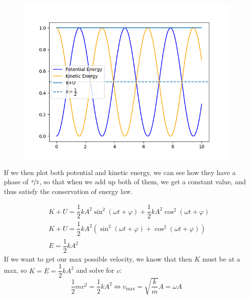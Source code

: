 \documentclass{report}
\begin{document}
        \begin{figure}
          \vspace{-1.4cm}
          \centering
          \includegraphics[width=\textwidth]{fotos/energies.png}
        \end{figure}

        \noindent If we then plot both potential and kinetic energy, we can see how they have a phase of $\nicefrac{\pi}{2}$, so that when we add up both of them, we get a constant value, and thus satisfy the conservation of energy law.
        
        \begin{equation}
          \begin{aligned}
          &K+U=\dfrac{1}{2}kA^2\sin^2(\omega t+\varphi)+\dfrac{1}{2}kA^2\cos^2(\omega t+\varphi)\\
          &K+U=\dfrac{1}{2}kA^2\left(\sin^2(\omega t+\varphi)+\cos^2(\omega t+\varphi)\right)\\
          &\boxed{E = \dfrac{1}{2}kA^2}
          \end{aligned}
        \end{equation}
        If we want to get our max possible velocity, we know that then $K$ must be at a max, so $K=E=\dfrac{1}{2}kA^2$ and solve for $v$:
        \begin{equation}
          \dfrac{1}{2}mv^2=\dfrac{1}{2}kA^2\Longleftrightarrow v_\text{max}=\sqrt{\dfrac{k}{m}}A=\omega A
        \end{equation}
        
        \clearpage
\end{document}

